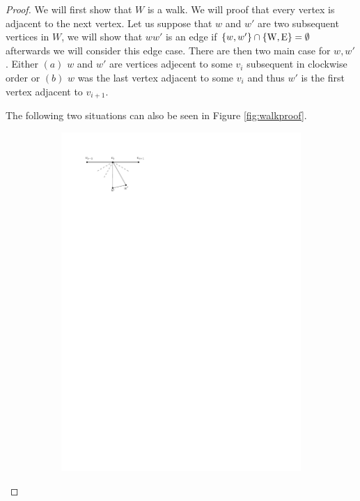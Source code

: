 \begin{proof}
We will first show that $W$ is a walk. We will proof that every vertex is adjacent to the next vertex. Let us suppose that $w$ and $w'$ are two subsequent vertices in $W$, we will show that $ww'$ is an edge if $\left\lbrace {w, w'} \right\rbrace \cap \left\lbrace {\mathrm{W}, \mathrm{E}} \right\rbrace = \emptyset$ afterwards we will consider this edge case. There are then two main case for $w, w'$. Either $(a)$ $w$ and $w'$ are vertices adjecent to some $v_i$ subsequent in clockwise order or $(b)$ $w$ was the last vertex adjacent to some $v_i$ and thus $w'$ is the first vertex adjacent to $v_{i+1}$.

The following two situations can also be seen in Figure \ref{fig:walkproof}.

\begin{figure}[h]
    \centering
    \begin{subfigure}[b]{0.5\linewidth}
        \includegraphics[width=\linewidth]{redAlgo/img/walkProofA}

\end{subfigure}
\end{figure}
\end{proof}
